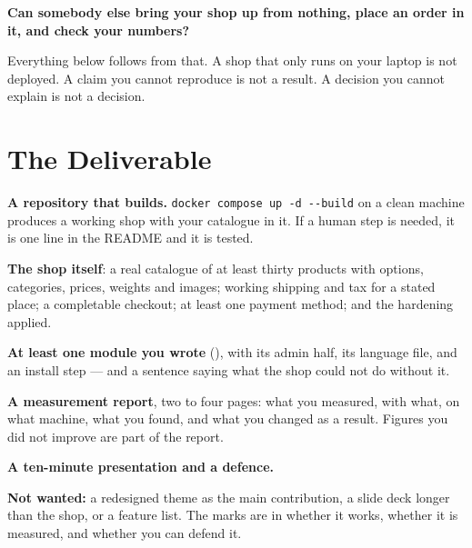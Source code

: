\begin{conceptbox}
\textbf{Can somebody else bring your shop up from nothing, place an order in
it, and check your numbers?}

\smallskip
Everything below follows from that. A shop that only runs on your laptop is not
deployed. A claim you cannot reproduce is not a result. A decision you cannot
explain is not a decision.
\end{conceptbox}

\section{The Deliverable}

\begin{examplebox}
\begin{tightnum}
  \item \textbf{A repository that builds.} \texttt{docker compose up -d
        -{}-build} on a clean machine produces a working shop with your
        catalogue in it. If a human step is needed, it is one line in the
        README and it is tested.
  \item \textbf{The shop itself}: a real catalogue of at least thirty products
        with options, categories, prices, weights and images; working shipping
        and tax for a stated place; a completable checkout; at least one
        payment method; and the  hardening applied.
  \item \textbf{At least one module you wrote} (), with its
        admin half, its language file, and an install step --- and a sentence
        saying what the shop could not do without it.
  \item \textbf{A measurement report}, two to four pages: what you measured,
        with what, on what machine, what you found, and what you changed as a
        result. Figures you did not improve are part of the report.
  \item \textbf{A ten-minute presentation and a defence.}
\end{tightnum}

\smallskip
\textbf{Not wanted:} a redesigned theme as the main contribution, a slide deck
longer than the shop, or a feature list. The marks are in whether it works,
whether it is measured, and whether you can defend it.
\end{examplebox}

